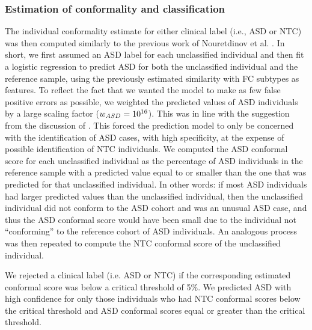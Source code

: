 \documentclass[9pt,lineno]{elife}
\begin{document}
\subsubsection{Estimation of conformality and classification}
The individual conformality estimate for either clinical label (i.e., ASD or NTC) was then computed similarly to the previous work of Nouretdinov et al. \citep{Nouretdinov2011-ph}. In short, we first assumed an ASD label for each unclassified individual and then fit a logistic regression to predict ASD for both the unclassified individual and the reference sample, using the previously estimated similarity with FC subtypes as features. To reflect the fact that we wanted the model to make as few false positive errors as possible, we weighted the predicted values of ASD individuals by a large scaling factor ($w_{ASD} = 10 \textsuperscript{16}$). This was in line with the suggestion from the discussion of \citet{Nouretdinov2011-ph}. This forced the prediction model to only be concerned with the identification of ASD cases, with high specificity, at the expense of possible identification of NTC individuals. We computed the ASD conformal score for each unclassified individual as the percentage of ASD individuals in the reference sample with a predicted value equal to or smaller than the one that was predicted for that unclassified individual. In other words: if most ASD individuals had larger predicted values than the unclassified individual, then the unclassified individual did not conform to the ASD cohort and was an unusual ASD case, and thus the ASD conformal score would have been small due to the individual not “conforming” to the reference cohort of ASD individuals. An analogous process was then repeated to compute the NTC conformal score of the unclassified individual.

We rejected a clinical label (i.e. ASD or NTC) if the corresponding estimated conformal score was below a critical threshold of 5\%. We predicted ASD with high confidence for only those individuals who had NTC conformal scores below the critical threshold and ASD conformal scores equal or greater than the critical threshold.
\end{document}
